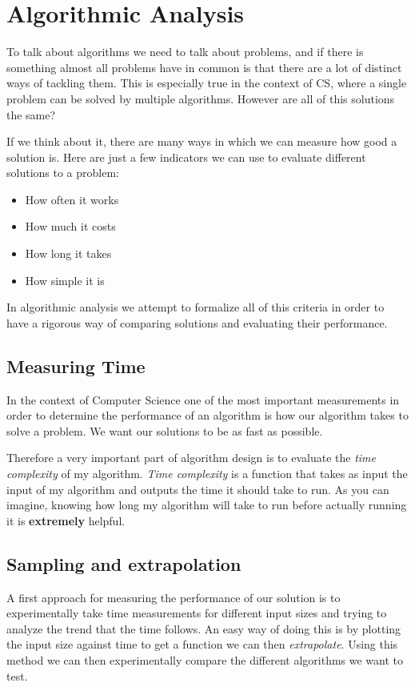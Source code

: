 \documentclass{article}
\begin{document}
\section{Algorithmic Analysis}

To talk about algorithms we need to talk about problems, and if there is something almost all problems have in common is that there are a lot of distinct ways of tackling them. This is especially true in the context of CS, where a single problem can be solved by multiple algorithms. However are all of this solutions the same? 

If we think about it, there are many ways in which we can measure how good a solution is. Here are just a few indicators we can use to evaluate different solutions to a problem:

\begin{itemize}
	\item How often it works
	\item How much it costs
	\item How long it takes
	\item How simple it is
\end{itemize}

In algorithmic analysis we attempt to formalize all of this criteria in order to have a rigorous way of comparing solutions and evaluating their performance.

\subsection{Measuring Time}

In the context of Computer Science one of the most important measurements in order to determine the performance of an algorithm is how our algorithm takes to solve a problem. We want our solutions to be as fast as possible.

Therefore a very important part of algorithm design is to evaluate the \textit{time complexity} of my algorithm. \textit{Time complexity} is a function that takes as input the input of my algorithm and outputs the time it should take to run. As you can imagine, knowing how long my algorithm will take to run before actually running it is \textbf{extremely} helpful.

\subsection{Sampling and extrapolation}

A first approach for measuring the performance of our solution is to experimentally take time measurements for different input sizes and trying to analyze the trend that the time follows. An easy way of doing this is by plotting the input size against time to get a function we can then \textit{extrapolate}. Using this method we can then experimentally compare the different algorithms we want to test.
\end{document}
